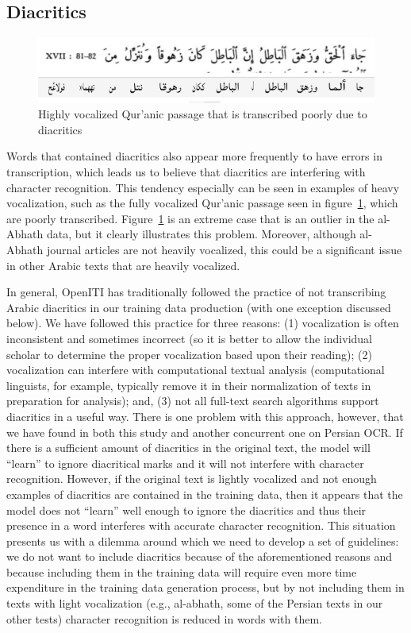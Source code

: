 \subsection{Diacritics}

\begin{figure}[!ht]
	\centering
	\includegraphics[width=\textwidth]{images/image27.png}
	\caption{Highly vocalized Qur’anic passage that is transcribed poorly due to diacritics}
  	\label{fig3:fig15}
\end{figure}

Words that contained diacritics also appear more frequently to have errors in
transcription, which leads us to believe that diacritics are interfering with
character recognition. This tendency especially can be seen in examples of
heavy vocalization, such as the fully vocalized Qur’anic passage seen in
figure~\ref{fig3:fig15}, which are poorly transcribed. Figure~\ref{fig3:fig15}
is an extreme case that is an outlier in the al-Abhath data, but it clearly
illustrates this problem.  Moreover, although al-Abhath journal articles are
not heavily vocalized, this could be a significant issue in other Arabic texts
that are heavily vocalized. 

In general, OpenITI has traditionally followed the practice of not transcribing
Arabic diacritics in our training data production (with one exception discussed
below). We have followed this practice for three reasons: (1) vocalization is
often inconsistent and sometimes incorrect (so it is better to allow the
individual scholar to determine the proper vocalization based upon their
reading); (2) vocalization can interfere with computational textual analysis
(computational linguists, for example, typically remove it in their
normalization of texts in preparation for analysis); and, (3) not all full-text
search algorithms support diacritics in a useful way. There is one problem with
this approach, however, that we have found in both this study and another
concurrent one on Persian OCR. If there is a sufficient amount of diacritics in
the original text, the model will “learn” to ignore diacritical marks and it
will not interfere with character recognition. However, if the original text is
lightly vocalized and not enough examples of diacritics are contained in the
training data, then it appears that the model does not “learn” well enough to
ignore the diacritics and thus their presence in a word interferes with
accurate character recognition. This situation presents us with a dilemma
around which we need to develop a set of guidelines: we do not want to include
diacritics because of the aforementioned reasons and because including them in
the training data will require even more time expenditure in the training data
generation process, but by not including them in texts with light vocalization
(e.g., al-abhath, some of the Persian texts in our other tests) character
recognition is reduced in words with them. 


